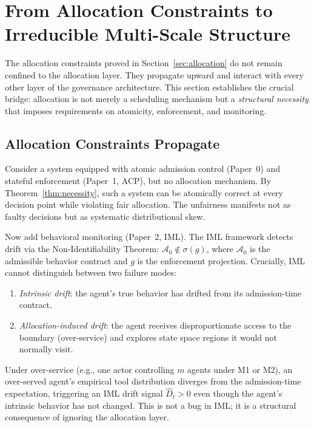 \documentclass[11pt]{article}
\newcommand{\Azero}{\mathcal{A}_0}
\newcommand{\Dhat}{\widehat{D}}
\begin{document}
\section{From Allocation Constraints to Irreducible Multi-Scale Structure}
\label{sec:bridge}

The allocation constraints proved in Section~\ref{sec:allocation} do not remain confined to the allocation layer. They propagate upward and interact with every other layer of the governance architecture. This section establishes the crucial bridge: allocation is not merely a scheduling mechanism but a \emph{structural necessity} that imposes requirements on atomicity, enforcement, and monitoring.

\subsection{Allocation Constraints Propagate}

Consider a system equipped with atomic admission control (Paper~0) and stateful enforcement (Paper~1, ACP), but no allocation mechanism. By Theorem~\ref{thm:necessity}, such a system can be atomically correct at every decision point while violating fair allocation. The unfairness manifests not as faulty decisions but as systematic distributional skew.

Now add behavioral monitoring (Paper~2, IML). The IML framework detects drift via the Non-Identifiability Theorem: $\Azero \notin \sigma(g)$, where $\Azero$ is the admissible behavior contract and $g$ is the enforcement projection. Crucially, IML cannot distinguish between two failure modes:
\begin{enumerate}[noitemsep]
  \item \emph{Intrinsic drift}: the agent's true behavior has drifted from its admission-time contract.
  \item \emph{Allocation-induced drift}: the agent receives disproportionate access to the boundary (over-service) and explores state space regions it would not normally visit.
\end{enumerate}

Under over-service (e.g., one actor controlling $m$ agents under M1 or M2), an over-served agent's empirical tool distribution diverges from the admission-time expectation, triggering an IML drift signal $\Dhat_t > 0$ even though the agent's intrinsic behavior has not changed. This is not a bug in IML; it is a structural consequence of ignoring the allocation layer.
\end{document}
